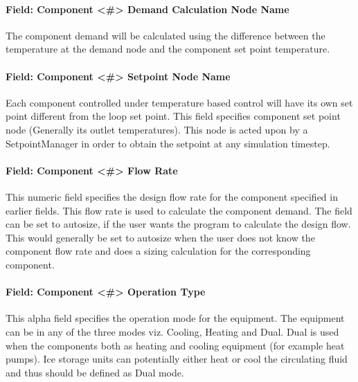 \paragraph{Field: Component \textless{}\#\textgreater{} Demand Calculation Node Name}\label{field-component-demand-calculation-node-name}

The component demand will be calculated using the difference between the temperature at the demand node and the component set point temperature.

\paragraph{Field: Component \textless{}\#\textgreater{} Setpoint Node Name}\label{field-component-setpoint-node-name}

Each component controlled under temperature based control will have its own set point different from the loop set point. This field specifies component set point node (Generally its outlet temperatures). This node is acted upon by a SetpointManager in order to obtain the setpoint at any simulation timestep.

\paragraph{Field: Component \textless{}\#\textgreater{} Flow Rate}\label{field-component-flow-rate-1}

This numeric field specifies the design flow rate for the component specified in earlier fields. This flow rate is used to calculate the component demand. The field can be set to autosize, if the user wants the program to calculate the design flow. This would generally be set to autosize when the user does not know the component flow rate and does a sizing calculation for the corresponding component.

\paragraph{Field: Component \textless{}\#\textgreater{} Operation Type}\label{field-component-operation-type}

This alpha field specifies the operation mode for the equipment. The equipment can be in any of the three modes viz. Cooling, Heating and Dual. Dual is used when the components both as heating and cooling equipment (for example heat pumps). Ice storage units can potentially either heat or cool the circulating fluid and thus should be defined as Dual mode.

